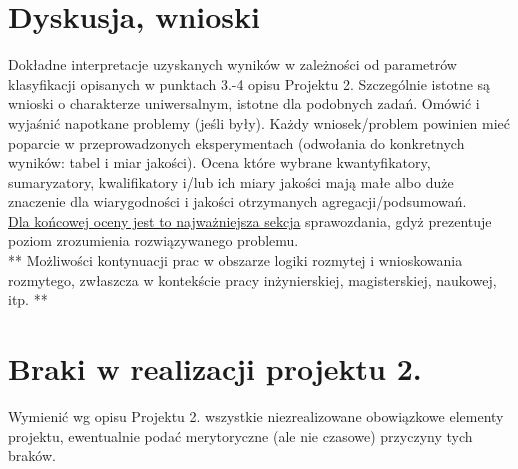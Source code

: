 \documentclass{classrep}
\begin{document}
\section{Dyskusja, wnioski}
Dokładne interpretacje uzyskanych wyników w zależności od parametrów klasyfikacji
opisanych w punktach 3.-4 opisu Projektu 2. 
Szczególnie istotne są wnioski o charakterze uniwersalnym, istotne dla podobnych zadań. 
Omówić i wyjaśnić napotkane problemy (jeśli były). Każdy wniosek/problem powinien mieć poparcie
w przeprowadzonych eksperymentach (odwołania do konkretnych wyników: tabel i miar
jakości). Ocena które wybrane kwantyfikatory, sumaryzatory, kwalifikatory i/lub ich
miary jakości mają małe albo duże znaczenie dla wiarygodności i jakości otrzymanych
agregacji/podsumowań.  \\
\underline{Dla końcowej oceny jest to najważniejsza sekcja} sprawozdania, gdyż prezentuje poziom
zrozumienia rozwiązywanego problemu.\\

** Możliwości kontynuacji prac w obszarze logiki rozmytej i wnioskowania rozmytego, zwłaszcza w kontekście pracy inżynierskiej,
magisterskiej, naukowej, itp. **\\



\section{Braki w realizacji projektu 2.}
Wymienić wg opisu Projektu 2. wszystkie niezrealizowane obowiązkowe elementy projektu, ewentualnie
podać merytoryczne (ale nie czasowe) przyczyny tych braków. 
\end{document}
